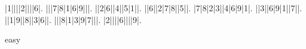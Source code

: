 \begin{sudoku}
|1||||2||||6|.
|||7|8|1|6|9|||.
||2|6||4||5|1||.
||6||2|7|8||5||.
|7|8|2|3||4|6|9|1|.
||3||6|9|1||7||.
||1|9||8||3|6||.
|||8|1|3|9|7|||.
|2||||6||||9|.
\end{sudoku}
\begin{center}
easy\end{center}
